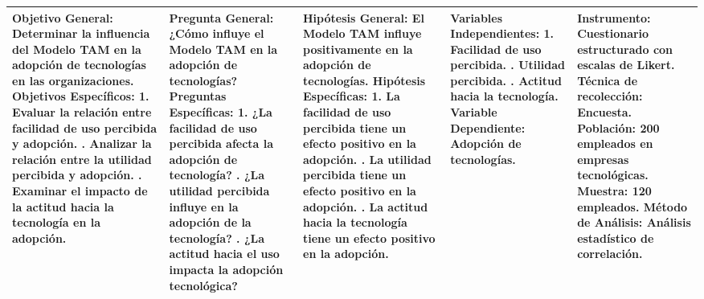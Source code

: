\begin{longtable}{|p{4cm}|p{4cm}|p{4cm}|p{4cm}|p{4cm}|}
\textbf{Objetivo General:} Determinar la influencia del Modelo TAM en la adopción de tecnologías en las organizaciones. \newline
\textbf{Objetivos Específicos:} 1. Evaluar la relación entre facilidad de uso percibida y adopción. \newline
2. Analizar la relación entre la utilidad percibida y adopción. \newline
3. Examinar el impacto de la actitud hacia la tecnología en la adopción. & 
\textbf{Pregunta General:} ¿Cómo influye el Modelo TAM en la adopción de tecnologías? \newline
\textbf{Preguntas Específicas:} 1. ¿La facilidad de uso percibida afecta la adopción de tecnología? \newline
2. ¿La utilidad percibida influye en la adopción de la tecnología? \newline
3. ¿La actitud hacia el uso impacta la adopción tecnológica? & 
\textbf{Hipótesis General:} El Modelo TAM influye positivamente en la adopción de tecnologías. \newline
\textbf{Hipótesis Específicas:} 1. La facilidad de uso percibida tiene un efecto positivo en la adopción. \newline
2. La utilidad percibida tiene un efecto positivo en la adopción. \newline
3. La actitud hacia la tecnología tiene un efecto positivo en la adopción. & 
\textbf{Variables Independientes:} 1. Facilidad de uso percibida. \newline
2. Utilidad percibida. \newline
3. Actitud hacia la tecnología. \newline
\textbf{Variable Dependiente:} Adopción de tecnologías. & 
\textbf{Instrumento:} Cuestionario estructurado con escalas de Likert. \newline
\textbf{Técnica de recolección:} Encuesta. \newline
\textbf{Población:} 200 empleados en empresas tecnológicas. \newline
\textbf{Muestra:} 120 empleados. \newline
\textbf{Método de Análisis:} Análisis estadístico de correlación. \\
\hline
\end{longtable}
